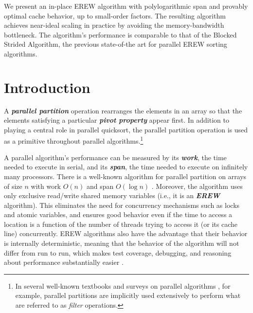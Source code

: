 \documentclass[11pt]{article}
\newcommand{\defn}[1]{{\textit{\textbf{\boldmath #1}}}}
\theoremstyle{remark}
\theoremstyle{remark}
\begin{document}
	We present an in-place EREW algorithm with polylogarithmic span and provably
	optimal cache behavior, up to small-order factors.  The resulting algorithm
	achieves near-ideal scaling in practice by avoiding the memory-bandwidth
	bottleneck. The algorithm's performance is comparable to that of the Blocked
	Strided Algorithm, the previous state-of-the art for parallel EREW sorting
	algorithms.

\thispagestyle{empty}
\clearpage
\setcounter{page}{1}

 

\section{Introduction}

A \defn{parallel partition} operation rearranges the elements in an
array so that the elements satisfying a particular \defn{pivot
  property} appear first. In addition to playing a central role in
parallel quicksort, the parallel partition operation is used as a
primitive throughout parallel algorithms.\footnote{In several
  well-known textbooks and surveys on parallel algorithms
  \cite{AcarBl16,Blelloch96}, for example, parallel partitions are
  implicitly used extensively to perform what are referred to as
  \emph{filter} operations.}

A parallel algorithm's performance can be measured by its \defn{work}, the time
needed to execute in serial, and its \defn{span}, the time needed to execute
on infinitely many processors. There is a well-known algorithm for
parallel partition on arrays of size $n$ with work $O(n)$ and span
$O(\log n)$ \cite{Blelloch96,AcarBl16}. Moreover, the algorithm uses
only exclusive read/write shared memory variables (i.e., it is an
\defn{EREW} algorithm). This eliminates the need for concurrency
mechanisms such as locks and atomic variables, and ensures good
behavior even if the time to access a location is a function of the
number of threads trying to access it (or its cache line)
concurrently. EREW algorithms also have the advantage that their
behavior is internally deterministic, meaning that
the behavior of the algorithm will not differ from run to run, which
makes test coverage, debugging, and reasoning about performance
substantially easier \cite{BlellochFi12}.
\end{document}
